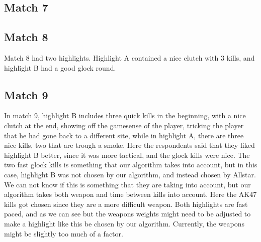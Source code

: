 \subsection{Match 7}
\subsection{Match 8}
Match 8 had two highlights. Highlight A contained a nice clutch with 3 kills, and highlight B had a good glock round.
\subsection{Match 9}
In match 9, highlight B includes three quick kills in the beginning, with a nice clutch at the end, showing off the gamesense of the player, tricking the player that he had gone back to a different site, while in highlight A, there are three nice kills, two that are trough a smoke. Here the respondents said that they liked highlight B better, since it was more tactical, and the glock kills were nice. The two fast glock kills is something that our algorithm takes into account, but in this case, highlight B was not chosen by our algorithm, and instead chosen by Allstar. We can not know if this is something that they are taking into account, but our algorithm takes both weapon and time between kills into account. Here the AK47 kills got chosen since they are a more difficult weapon. Both highlights are fast paced, and as we can see but the weapons weights might need to be adjusted to make a highlight like this be chosen by our algorithm. Currently, the weapons might be slightly too much of a factor. 



